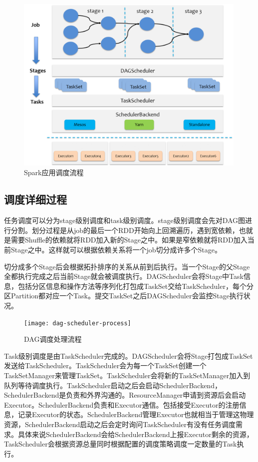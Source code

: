 \begin{figure}[htbp]
    \centering
    \includegraphics[width=0.99\textwidth]{Img/spark-scheduler-overview.png}
    \caption{Spark应用调度流程}
    \label{fig:application-schedule-process}
\end{figure}

\subsection{调度详细过程}
任务调度可以分为stage级别调度和task级别调度。stage级别调度会先对DAG图进行分割。划分过程是从job的最后一个RDD开始向上回溯遍历，遇到宽依赖，也就是需要Shuffle的依赖就将RDD加入新的Stage之中。如果是窄依赖就将RDD加入当前Stage之中。这样就可以根据依赖关系将一个job切分成许多个Stage。

切分成多个Stage后会根据拓扑排序的关系从前到后执行。当一个Stage的父Stage全都执行完成之后当前Stage就会被调度执行。DAGScheduler会将Stage中Task信息，包括分区信息和操作方法等序列化打包成TaskSet交给TaskScheduler，每个分区Partition都对应一个Task。提交TaskSet之后DAGScheduler会监控Stage执行状况。

\begin{figure}[htbp]
    \centering
    \texttt{[image: dag-scheduler-process]}
    \caption{DAG调度处理流程}
    \label{fig:dag-scheduler-process}
\end{figure}

Task级别调度是由TaskScheduler完成的。DAGScheduler会将Stage打包成TaskSet发送给TaskScheduler。TaskScheduler会为每一个TaskSet创建一个TaskSetManager来管理TaskSet。TaskScheduler会将新的TaskSetManager加入到队列等待调度执行。TaskScheduler启动之后会启动SchedulerBackend，SchedulerBackend是负责和外界沟通的。ResourceManager申请到资源后会启动Executor。SchedulerBackend负责和Executor通信。包括接受Executor的注册信息，记录Executor的状态。SchedulerBackend管理Executor也就相当于管理这物理资源，SchedulerBackend启动之后会定时询问TaskScheduler有没有任务调度需求。具体来说SchedulerBackend会给SchedulerBackend上报Executor剩余的资源，TaskScheduler会根据资源总量同时根据配置的调度策略调度一定数量的Task执行。

